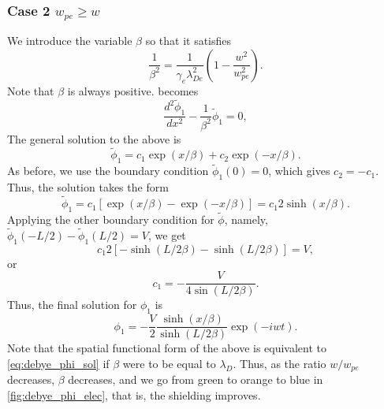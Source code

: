 \documentclass[a4paper,11pt]{report}
\begin{document}
\subsubsection{Case 2 $w_{pe} \ge w$}
We introduce the variable $\beta$ so that it satisfies
\begin{equation}
    \frac{1}{\beta^2} = \frac{1}{\gamma_e \lambda^2_{De}} \left( 1 - \frac{w^2}{w^2_{pe}} \right).
\end{equation}
Note that $\beta$ is always positive.  becomes 
\begin{equation}
    \frac{d^2 \tilde{\phi}_1}{dx^2} - \frac{1}{\beta^2} \tilde{\phi}_1 = 0,
\end{equation}
The general solution to the above is
\begin{equation*}
    \tilde{\phi}_1 = c_1 \exp (x / \beta) + c_2 \exp (-x / \beta).
\end{equation*}
As before, we use the boundary condition $\tilde{\phi}_1(0) = 0$, which gives $c_2 = -c_1$. Thus, the solution takes the form
\begin{equation*}
    \tilde{\phi}_1 = c_1 \left[ \exp (x / \beta) - \exp (-x / \beta) \right] = c_1 2 \sinh (x / \beta).
\end{equation*}
Applying the other boundary condition for $\tilde{\phi}$, namely, $\tilde{\phi}_1(-L/2) - \tilde{\phi}_1(L/2) = V$, we get
\begin{equation*}
    c_1 2 \left[ -\sinh \left( L / 2 \beta \right) - \sinh \left( L / 2 \beta \right) \right] = V,
\end{equation*}
or
\begin{equation*}
    c_1 = - \frac{V}{4 \sin \left( L / 2 \beta \right)}.
\end{equation*}
Thus, the final solution for $\phi_1$ is
\begin{equation}
    \phi_1 = - \frac{V}{2} \frac{\sinh (x / \beta)}{\sinh (L / 2 \beta)} \exp(-iwt).
\end{equation}
Note that the spatial functional form of the above is equivalent to \cref{eq:debye_phi_sol} if $\beta$ were to be equal to $\lambda_D$. Thus, as the ratio $w/w_{pe}$ decreases, $\beta$ decreases, and we go from green to orange to blue in \cref{fig:debye_phi_elec}, that is, the shielding improves.
\end{document}
